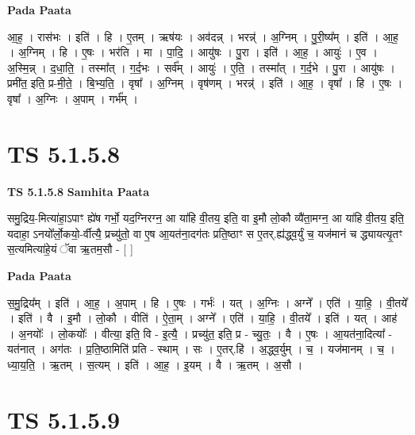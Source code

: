 \documentclass[17pt]{extarticle}
\begin{document}
\textbf{Pada Paata} \newline

आ॒ह॒ । रास॑भः । इति॑ । हि । ए॒तम् । ऋष॑यः । अव॑दन्न् । भरन्न्॑ । अ॒ग्निम् । पु॒री॒ष्य᳚म् । इति॑ । आ॒ह॒ । अ॒ग्निम् । हि । ए॒षः । भर॑ति । मा । पा॒दि॒ । आयु॑षः । पु॒रा । इति॑ । आ॒ह॒ । आयुः॑ । ए॒व । अ॒स्मि॒न्न् । द॒धा॒ति॒ । तस्मा᳚त् । ग॒र्द॒भः । सर्व᳚म् । आयुः॑ । ए॒ति॒ । तस्मा᳚त् । ग॒र्द॒भे । पु॒रा । आयु॑षः । प्रमी॑त॒ इति॒ प्र-मी॒ते॒ । बि॒भ्य॒ति॒ । वृषा᳚ । अ॒ग्निम् । वृष॑णम् । भरन्न्॑ । इति॑ । आ॒ह॒ । वृषा᳚ । हि । ए॒षः । वृषा᳚ । अ॒ग्निः । अ॒पाम् । गर्भ᳚म् ।  \newline




\section*{ TS 5.1.5.8 }

\textbf{TS 5.1.5.8 } \newline
\textbf{Samhita Paata} \newline

समु॒द्रिय॒-मित्या॑हा॒ऽपाꣳ ह्ये॑ष गर्भो॒ यद॒ग्निरग्न॒ आ या॑हि वी॒तय॒ इति॒ वा इ॒मौ लो॒कौ व्यै॑ता॒मग्न॒ आ या॑हि वी॒तय॒ इति॒ यदाहा॒ ऽनयो᳚र्लो॒कयो॒-र्वीत्यै॒ प्रच्यु॑तो॒ वा ए॒ष आ॒यत॑ना॒दग॑तः प्रति॒ष्ठाꣳ स ए॒तर्.ह्य॑द्ध्व॒र्युं च॒ यज॑मानं च द्ध्यायत्यृ॒तꣳ स॒त्यमित्या॑हे॒यं ॅवा ऋ॒तम॒सौ - [  ] \newline

\textbf{Pada Paata} \newline

स॒मु॒द्रिय᳚म् । इति॑ । आ॒ह॒ । अ॒पाम् । हि । ए॒षः । गर्भः॑ । यत् । अ॒ग्निः । अग्ने᳚ । एति॑ । या॒हि॒ । वी॒तये᳚ । इति॑ । वै । इ॒मौ । लो॒कौ । वीति॑ । ऐ॒ता॒म् । अग्ने᳚ । एति॑ । या॒हि॒ । वी॒तये᳚ । इति॑ । यत् । आह॑ । अ॒नयोः᳚ । लो॒कयोः᳚ । वीत्या॒ इति॒ वि - इ॒त्यै॒ । प्रच्यु॑त॒ इति॒ प्र - च्यु॒तः॒ । वै । ए॒षः । आ॒यत॑ना॒दित्या᳚ - यत॑नात् । अग॑तः । प्र॒ति॒ष्ठामिति॑ प्रति - स्थाम् । सः । ए॒तर्.हि॑ । अ॒द्ध्व॒र्युम् । च॒ । यज॑मानम् । च॒ । ध्या॒य॒ति॒ । ऋ॒तम् । स॒त्यम् । इति॑ । आ॒ह॒ । इ॒यम् । वै । ऋ॒तम् । अ॒सौ ।  \newline




\section*{ TS 5.1.5.9 }
\end{document}
